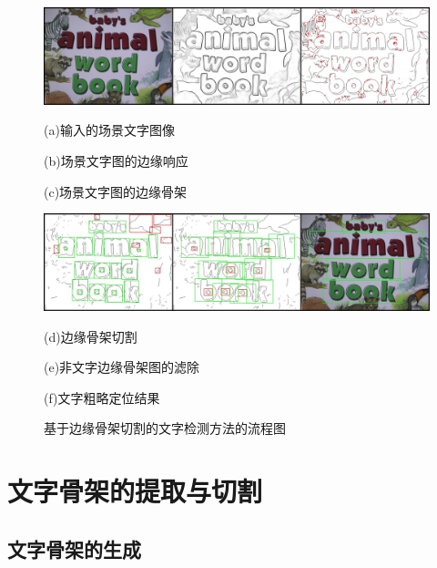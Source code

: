     \begin{figure}[!h]
    \centering
    \includegraphics[width=\textwidth]{./figures/c31_overview_1.jpg}
    \begin{minipage}[t]{0.32\linewidth}
    \centerline{ \small (a)输入的场景文字图像}
    \end{minipage}
    \begin{minipage}[t]{0.32\linewidth}
    \centerline{ \small (b)场景文字图的边缘响应}
    \end{minipage}
    \begin{minipage}[t]{0.32\linewidth}
    \centerline{ \small (c)场景文字图的边缘骨架}
    \end{minipage}
    \includegraphics[width=\textwidth]{./figures/c31_overview_2.jpg}
    \begin{minipage}[t]{0.32\linewidth}
    \centerline{ \small (d)边缘骨架切割}
    \end{minipage}
    \begin{minipage}[t]{0.32\linewidth}
    \centerline{ \small (e)非文字边缘骨架图的滤除}
    \end{minipage}
    \begin{minipage}[t]{0.32\linewidth}
    \centerline{ \small (f)文字粗略定位结果}
    \end{minipage}
    \caption{基于边缘骨架切割的文字检测方法的流程图}
    \label{fig.c31_overview}
    \end{figure}

    \section{文字骨架的提取与切割}

        \subsection{文字骨架的生成}

